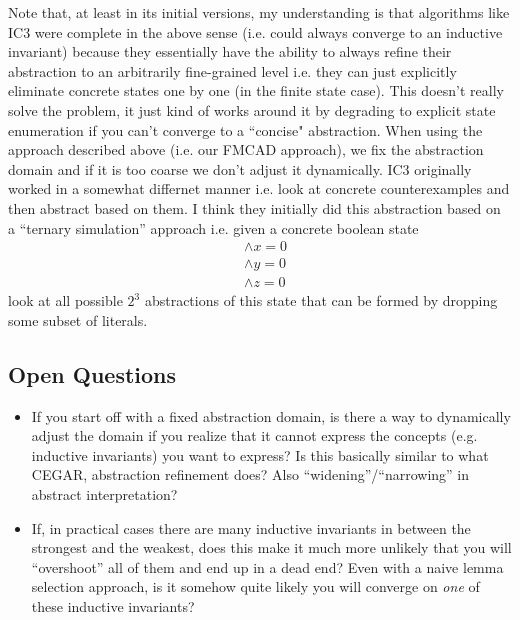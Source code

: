\documentclass[10pt]{article}
\begin{document}
Note that, at least in its initial versions, my understanding is that algorithms like IC3 were complete in the above sense (i.e. could always converge to an inductive invariant) because they essentially have the ability to always refine their abstraction to an arbitrarily fine-grained level i.e. they can just explicitly eliminate concrete states one by one (in the finite state case). This doesn't really solve the problem, it just kind of works around it by degrading to explicit state enumeration if you can't converge to a ``concise" abstraction. When using the approach described above (i.e. our FMCAD approach), we fix the abstraction domain and if it is too coarse we don't adjust it dynamically. IC3 originally worked in a somewhat differnet manner i.e. look at concrete counterexamples and then abstract based on them. I think they initially did this abstraction based on a ``ternary simulation'' approach i.e. given a concrete boolean state 
\begin{align*}
    &\wedge x = 0 \\ 
    &\wedge y = 0 \\ 
    &\wedge z = 0
\end{align*}
look at all possible $2^3$ abstractions of this state that can be formed by dropping some subset of literals.



\subsection*{Open Questions}

\begin{itemize}
    \item If you start off with a fixed abstraction domain, is there a way to dynamically adjust the domain if you realize that it cannot express the concepts (e.g. inductive invariants) you want to express? Is this basically similar to what CEGAR, abstraction refinement does? Also ``widening''/``narrowing'' in abstract interpretation?
    \item If, in practical cases there are many inductive invariants in between the strongest and the weakest, does this make it much more unlikely that you will ``overshoot'' all of them and end up in a dead end? Even with a naive lemma selection approach, is it somehow quite likely you will converge on \textit{one} of these inductive invariants?
\end{itemize}







% 
% 

\end{document}
